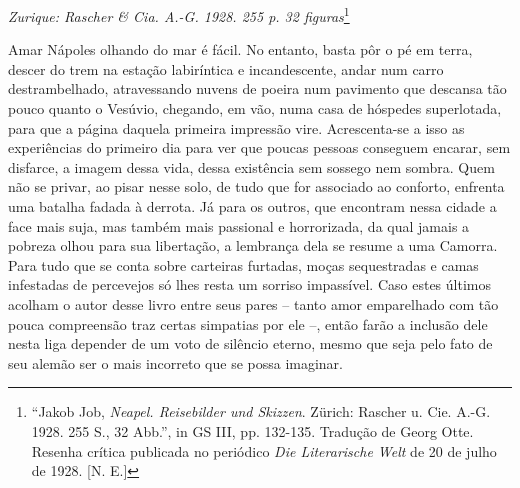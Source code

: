 \emph{Zurique: Rascher \& Cia. A.-G. 1928. 255 p. 32 figuras}\footnote{``Jakob
  Job, \emph{Neapel. Reisebilder und Skizzen}. Zürich: Rascher u. Cie.
  A.-G. 1928. 255 S., 32 Abb.'', in GS III, pp. 132-135. Tradução de
  Georg Otte. Resenha crítica publicada no periódico \emph{Die
  Literarische Welt} de 20 de julho de 1928. {[}N. E.{]}}

Amar Nápoles olhando do mar é fácil. No entanto, basta pôr o pé em
terra, descer do trem na estação labiríntica e incandescente, andar num
carro destrambelhado, atravessando nuvens de poeira num pavimento que
descansa tão pouco quanto o Vesúvio, chegando, em vão, numa casa de
hóspedes superlotada, para que a página daquela primeira impressão vire.
Acrescenta-se a isso as experiências do primeiro dia para ver que poucas
pessoas conseguem encarar, sem disfarce, a imagem dessa vida, dessa
existência sem sossego nem sombra. Quem não se privar, ao pisar nesse
solo, de tudo que for associado ao conforto, enfrenta uma batalha fadada
à derrota. Já para os outros, que encontram nessa cidade a face mais
suja, mas também mais passional e horrorizada, da qual jamais a pobreza
olhou para sua libertação, a lembrança dela se resume a uma Camorra.
Para tudo que se conta sobre carteiras furtadas, moças sequestradas e
camas infestadas de percevejos só lhes resta um sorriso impassível. Caso
estes últimos acolham o autor desse livro entre seus pares -- tanto amor
emparelhado com tão pouca compreensão traz certas simpatias por ele --,
então farão a inclusão dele nesta liga depender de um voto de silêncio
eterno, mesmo que seja pelo fato de seu alemão ser o mais incorreto que
se possa imaginar.

